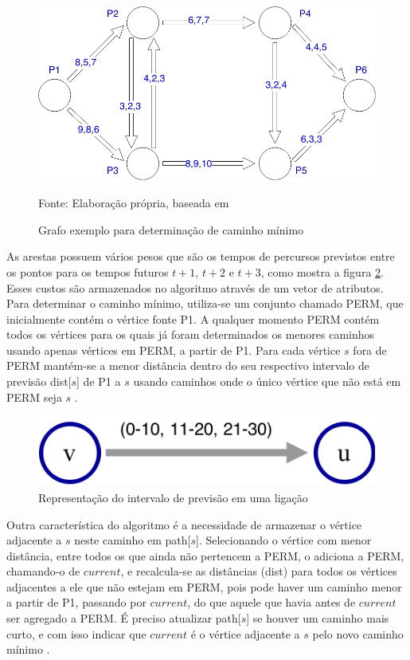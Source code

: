 \begin{figure}[htbp]
\centering
 \includegraphics[width=.60\textwidth]{chapters/fig/leo1.png}
\caption{Grafo exemplo para determinação de caminho mínimo}
Fonte: Elaboração própria, baseada em \cite{leonard}
\label{fig:leo1}
\end{figure}

As arestas possuem vários pesos que são os tempos de percursos previstos entre os pontos para os tempos
futuros $t + 1$, $t + 2$ e $t + 3$, como mostra a figura \ref{fig:intervalotemporal}. Esses custos são armazenados
no algoritmo através de um vetor de atributos.
Para determinar o caminho mínimo, utiliza-se um conjunto chamado PERM, que inicialmente contém o vértice fonte P1.
A qualquer momento PERM contém todos os vértices para os quais já foram determinados os menores caminhos usando
apenas vértices em PERM, a partir de P1. Para cada vértice $s$ fora de PERM mantém-se a menor distância dentro do
seu respectivo intervalo de previsão dist[$s$] de P1 a $s$ usando caminhos onde o único vértice que não está em
PERM seja $s$ \cite{leonard}.

\begin{figure}[htbp]
\centering
 \includegraphics[width=.60\textwidth]{chapters/fig/intervalotemporal.png}
\caption{Representação do intervalo de previsão em uma ligação}
\label{fig:intervalotemporal}
\end{figure}

Outra característica do algoritmo é a necessidade de armazenar o vértice adjacente
a $s$ neste caminho em path[$s$]. Selecionando o vértice com menor distância, entre todos os que ainda não pertencem
a PERM, o adiciona a PERM, chamando-o de $current$, e recalcula-se as distâncias (dist) para todos os vértices
adjacentes a ele que não estejam em PERM, pois pode haver um caminho menor a partir de P1, passando por $current$, 
do que aquele que havia antes de $current$ ser agregado a PERM. É preciso atualizar path[$s$] se houver um caminho
mais curto, e com isso indicar que $current$ é o vértice adjacente a $s$ pelo novo caminho mínimo \cite{leonard}.

